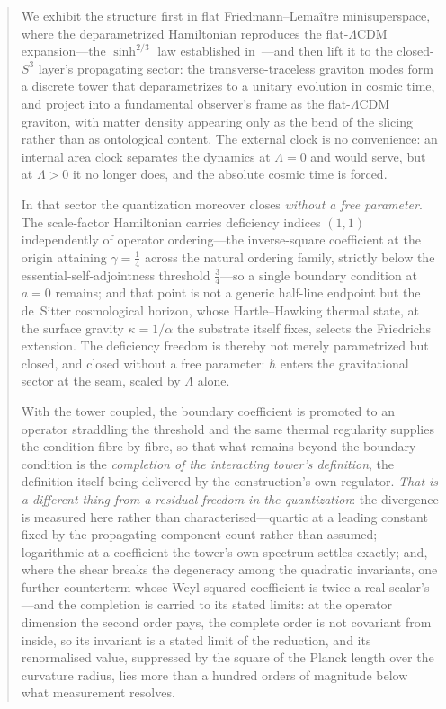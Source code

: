 \documentclass[11pt,a4paper]{article}
\theoremstyle{plain}
\theoremstyle{definition}
\theoremstyle{remark}
\begin{document}
\begin{abstract}
We exhibit the structure first in flat Friedmann--Lema\^itre minisuperspace, where the deparametrized Hamiltonian reproduces the flat-$\Lambda$CDM expansion---the $\sinh^{2/3}$ law established in~\cite{JanzenCRframework}---and then lift it to the closed-$S^3$ layer's propagating sector: the transverse-traceless graviton modes form a discrete tower that deparametrizes to a unitary evolution in cosmic time, and project into a fundamental observer's frame as the flat-$\Lambda$CDM graviton, with matter density appearing only as the bend of the slicing rather than as ontological content. The external clock is no convenience: an internal area clock separates the dynamics at $\Lambda=0$ and would serve, but at $\Lambda>0$ it no longer does, and the absolute cosmic time is forced. 

In that sector the quantization moreover closes \emph{without a free parameter}. The scale-factor Hamiltonian carries deficiency indices $(1,1)$ independently of operator ordering---the inverse-square coefficient at the origin attaining $\gamma=\tfrac14$ across the natural ordering family, strictly below the essential-self-adjointness threshold $\tfrac34$---so a single boundary condition at $a=0$ remains; and that point is not a generic half-line endpoint but the de~Sitter cosmological horizon, whose Hartle--Hawking thermal state, at the surface gravity $\kappa=1/\alpha$ the substrate itself fixes, selects the Friedrichs extension. The deficiency freedom is thereby not merely parametrized but closed, and closed without a free parameter: $\hbar$ enters the gravitational sector at the seam, scaled by $\Lambda$ alone. 

With the tower coupled, the boundary coefficient is promoted to an operator straddling the threshold and the same thermal regularity supplies the condition fibre by fibre, so that what remains beyond the boundary condition is the \emph{completion of the interacting tower's definition}, the definition itself being delivered by the construction's own regulator. \emph{That is a different thing from a residual freedom in the quantization}: the divergence is measured here rather than characterised---quartic at a leading constant fixed by the propagating-component count rather than assumed; logarithmic at a coefficient the tower's own spectrum settles exactly; and, where the shear breaks the degeneracy among the quadratic invariants, one further counterterm whose Weyl-squared coefficient is twice a real scalar's---and the completion is carried to its stated limits: at the operator dimension the second order pays, the complete order is not covariant from inside, so its invariant is a stated limit of the reduction, and its renormalised value, suppressed by the square of the Planck length over the curvature radius, lies more than a hundred orders of magnitude below what measurement resolves. 


\end{abstract}
\end{document}
